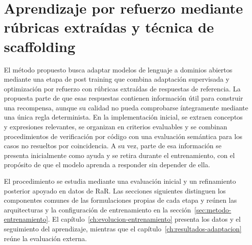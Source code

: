 \chapter{Aprendizaje por refuerzo mediante rúbricas extraídas y técnica de scaffolding}
\label{ch:metodo-propuesto}

El método propuesto busca adaptar modelos de lenguaje a dominios abiertos mediante una etapa de post training que combina adaptación supervisada y optimización por refuerzo con rúbricas extraídas de respuestas de referencia. La propuesta parte de que esas respuestas contienen información útil para construir una recompensa, aunque su calidad no pueda comprobarse íntegramente mediante una única regla determinista. En la implementación inicial, se extraen conceptos y expresiones relevantes, se organizan en criterios evaluables y se combinan procedimientos de verificación por código con una evaluación semántica para los casos no resueltos por coincidencia. A su vez, parte de esa información se presenta inicialmente como ayuda y se retira durante el entrenamiento, con el propósito de que el modelo aprenda a responder sin depender de ella.

El procedimiento se estudia mediante una evaluación inicial y un refinamiento posterior apoyado en datos de RaR. Las secciones siguientes distinguen los componentes comunes de las formulaciones propias de cada etapa y reúnen las arquitecturas y la configuración de entrenamiento en la sección~\ref{sec:metodo-entrenamiento}. El capítulo~\ref{ch:evolucion-entrenamiento} presenta los datos y el seguimiento del aprendizaje, mientras que el capítulo~\ref{ch:resultados-adaptacion} reúne la evaluación externa.

%
%
%
%
%
%

